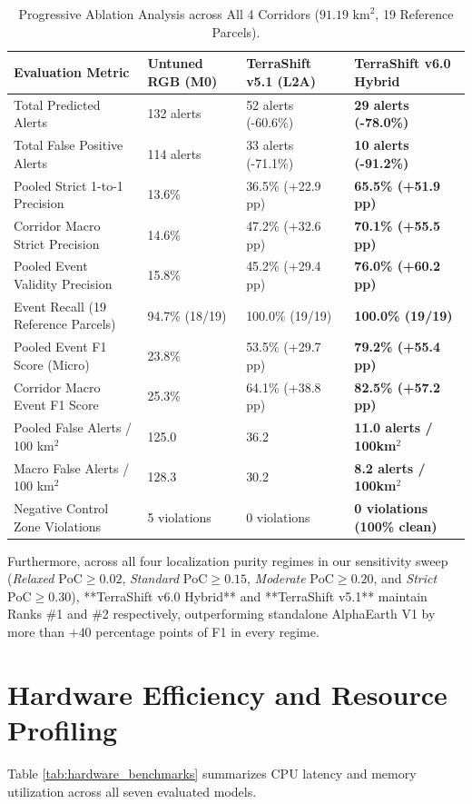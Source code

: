 \begin{table}[htbp]
\centering
\caption{Progressive Ablation Analysis across All 4 Corridors ($91.19\text{ km}^2$, 19 Reference Parcels).}
\label{tab:ablation_comparison}
\begin{tabularx}{\textwidth}{@{}lXXX@{}}
\toprule
\textbf{Evaluation Metric} & \textbf{Untuned RGB (M0)} & \textbf{TerraShift v5.1 (L2A)} & \textbf{TerraShift v6.0 Hybrid} \\
\midrule
Total Predicted Alerts & 132 alerts & 52 alerts (-60.6\%) & \textbf{29 alerts (-78.0\%)} \\
Total False Positive Alerts & 114 alerts & 33 alerts (-71.1\%) & \textbf{10 alerts (-91.2\%)} \\
Pooled Strict 1-to-1 Precision & 13.6\% & 36.5\% (+22.9 pp) & \textbf{65.5\% (+51.9 pp)} \\
Corridor Macro Strict Precision & 14.6\% & 47.2\% (+32.6 pp) & \textbf{70.1\% (+55.5 pp)} \\
Pooled Event Validity Precision & 15.8\% & 45.2\% (+29.4 pp) & \textbf{76.0\% (+60.2 pp)} \\
Event Recall (19 Reference Parcels) & 94.7\% (18/19) & 100.0\% (19/19) & \textbf{100.0\% (19/19)} \\
Pooled Event F1 Score (Micro) & 23.8\% & 53.5\% (+29.7 pp) & \textbf{79.2\% (+55.4 pp)} \\
Corridor Macro Event F1 Score & 25.3\% & 64.1\% (+38.8 pp) & \textbf{82.5\% (+57.2 pp)} \\
Pooled False Alerts / 100 km$^2$ & 125.0 & 36.2 & \textbf{11.0 alerts / 100km$^2$} \\
Macro False Alerts / 100 km$^2$ & 128.3 & 30.2 & \textbf{8.2 alerts / 100km$^2$} \\
Negative Control Zone Violations & 5 violations & 0 violations & \textbf{0 violations (100\% clean)} \\
\bottomrule
\end{tabularx}
\end{table}

Furthermore, across all four localization purity regimes in our sensitivity sweep (\textit{Relaxed} $\text{PoC}\ge 0.02$, \textit{Standard} $\text{PoC}\ge 0.15$, \textit{Moderate} $\text{PoC}\ge 0.20$, and \textit{Strict} $\text{PoC}\ge 0.30$), **TerraShift v6.0 Hybrid** and **TerraShift v5.1** maintain Ranks \#1 and \#2 respectively, outperforming standalone AlphaEarth V1 by more than $+40$ percentage points of F1 in every regime.

\section{Hardware Efficiency and Resource Profiling}
\label{sec:res_hardware_profile}
Table \ref{tab:hardware_benchmarks} summarizes CPU latency and memory utilization across all seven evaluated models.

